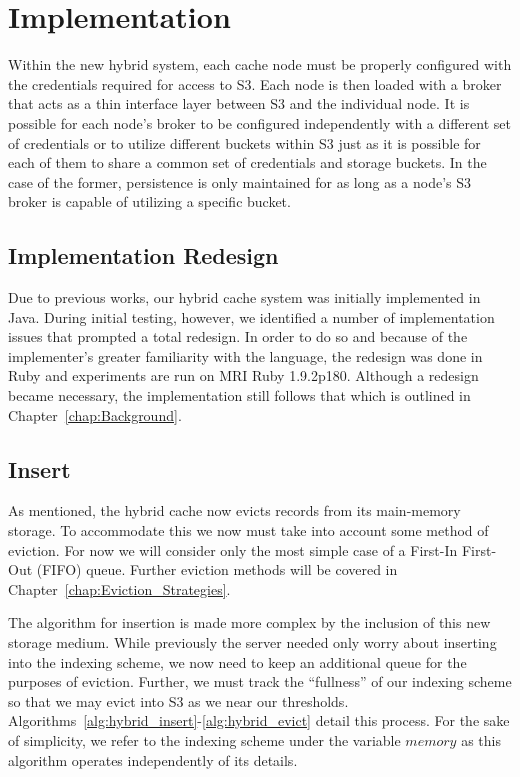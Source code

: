 
\section{Implementation} %
\label{sec:Implementation}
Within the new hybrid system, each cache node must be properly configured with
the credentials required for access to S3. Each node is then loaded with a
broker that acts as a thin interface layer between S3 and the individual node.
It is possible for each node's broker to be configured independently with a
different set of credentials or to utilize different buckets within S3 just as
it is possible for each of them to share a common set of credentials and
storage buckets. In the case of the former, persistence is only maintained for
as long as a node's S3 broker is capable of utilizing a specific bucket.

\subsection{Implementation Redesign} %
\label{sec:hybrid_redesign}
Due to previous works\cite{chiu_ijngc11,chiu_ccgrid11}, our hybrid cache system
was initially implemented in Java. During initial testing, however, we
identified a number of implementation issues that prompted a total redesign. In
order to do so and because of the implementer's greater familiarity with the
language, the redesign was done in Ruby and experiments are run on MRI Ruby
1.9.2p180. Although a redesign became necessary, the implementation still
follows that which is outlined in Chapter~\ref{chap:Background}.


\subsection{Insert} %
\label{sub:hybrid_insert}
As mentioned, the hybrid cache now evicts records from its main-memory storage.
To accommodate this we now must take into account some method of eviction. For
now we will consider only the most simple case of a First-In First-Out (FIFO)
queue. Further eviction methods will be covered in
Chapter~\ref{chap:Eviction_Strategies}.

The algorithm for insertion is made more complex by the inclusion of this new
storage medium. While previously the server needed only worry about inserting
into the indexing scheme, we now need to keep an additional queue for the
purposes of eviction. Further, we must track the ``fullness'' of our indexing
scheme so that we may evict into S3 as we near our thresholds.
Algorithms~\ref{alg:hybrid_insert}-\ref{alg:hybrid_evict} detail this process.
For the sake of simplicity, we refer to the indexing scheme under the variable
$memory$ as this algorithm operates independently of its details.

